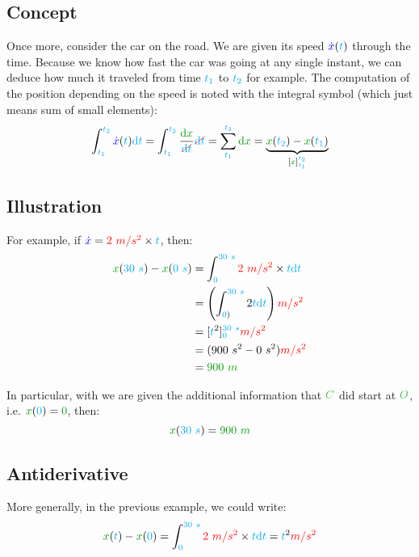 \subsection{Concept}

Once more, consider the car on the road. We are given its speed
$\textcolor{blue}{\dot x}(\textcolor{cyan}{t})$ through the time. Because we know how fast the
car was going at any single instant, we can deduce how much it traveled
from time $\textcolor{cyan}{t_1}$ to $\textcolor{cyan}{t_2}$ for example. The computation
of the position depending on the speed is
noted with the integral symbol (which just means sum of small elements):
\[
\int_{\delay{t_1}}^{\delay{t_2}} \speed{\dot x}(\delay{t}) \delay{\dt}
= \int_{\delay{t_1}}^{\delay{t_2}} \frac {\dist{\d x}} {\strike[red]{\delay{\dt}}} \strike[red]{\delay{\dt}}
= \sum_{\delay{t_1}}^{\delay{t_2}} \dist{\d x}
= \underbrace{
	\dist{x}(\delay{t_2}) - \dist{x}(\delay{t_1})
}_{[\dist{x}]_{\delay{t_1}}^{\delay{t_2}}}
\]


\subsection{Illustration}

For example, if $\textcolor{blue}{\dot x} = \textcolor{red}{2~m/s^2} \times \textcolor{cyan}{t}$, then:
\begin{align*}
\dist{x}(\delay{30~s}) - \dist{x}(\delay{0~s})
&= \int_{\delay{0}}^{\delay{30~s}} \accel{2~m/s^2} \times \delay{t} \delay{\dt} \\
&= \left(\int_{\delay{0})}^{\delay{30~s}} 2 \delay{t} \delay{\dt}\right) \accel{m/s^2} \\
&= [\delay{t}^2]_{\delay{0}}^{\delay{30~s}} \accel{m/s^2} \\
&= (900~s^2 - 0~s^2) \accel{m/s^2} \\
&= \dist{900~m}
\end{align*}

In particular, with we are given the additional information that $\posit{C}$
did start at $\posit{O}$, i.e.  $\dist{x}(\delay{0}) = \dist{0}$, then:
\[
\dist{x}(\delay{30~s}) = \dist{900~m}
\]


\subsection{Antiderivative}

More generally, in the previous example, we could write:
\[
\dist{x}(\delay{t}) - \dist{x}(\delay{0})
= \int_{\delay{0}}^{\delay{30~s}} \accel{2~m/s^2} \times \delay{t} \delay{\dt}
= \delay{t}^2 \accel{m/s^2}
\]

